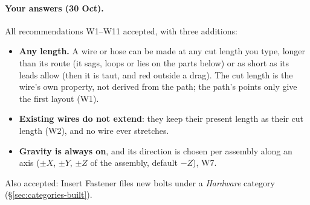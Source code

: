 \paragraph{Your answers (30 Oct).} All recommendations W1--W11 accepted, with three additions:
\begin{itemize}[nosep]
  \item \textbf{Any length.} A wire or hose can be made at any cut length you type, longer than its route (it
        sags, loops or lies on the parts below) or as short as its leads allow (then it is taut, and red outside a
        drag). The cut length is the wire's own property, not derived from the path; the path's points only give
        the first layout (W1).
  \item \textbf{Existing wires do not extend}: they keep their present length as their cut length (W2), and no
        wire ever stretches.
  \item \textbf{Gravity is always on}, and its direction is chosen per assembly along an axis ($\pm X$, $\pm Y$,
        $\pm Z$ of the assembly, default $-Z$), W7.
\end{itemize}
Also accepted: Insert Fastener files new bolts under a \emph{Hardware} category (\S\ref{sec:categories-built}).
